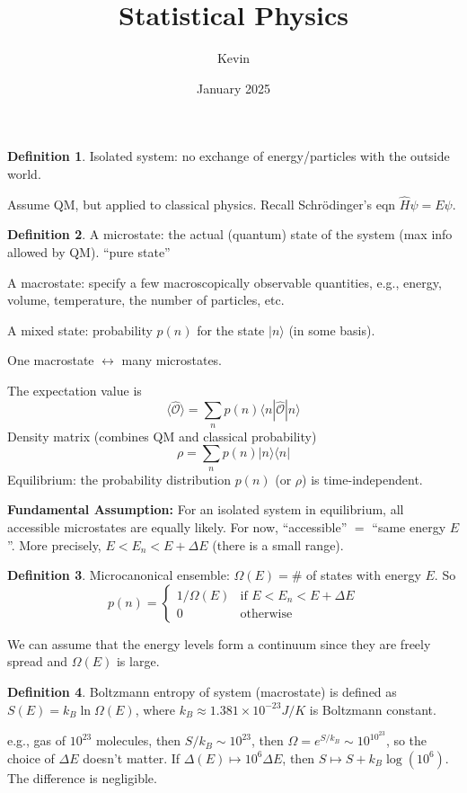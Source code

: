\documentclass{article}
\title{Statistical Physics}
\author{Kevin}
\date{January 2025}
\theoremstyle{definition}
\newtheorem{defn}{Definition}[section]
\theoremstyle{remark}
\theoremstyle{plain}
\begin{document}
\maketitle
\section{}
\begin{defn}
    Isolated system: no exchange of energy/particles with the outside world.
\end{defn}
Assume QM, but applied to classical physics.
Recall Schr\"odinger's eqn $\hat H\psi=E\psi$.
\begin{defn}
    A microstate: the actual (quantum) state of the system (max info allowed by QM). ``pure state''

    A macrostate: specify a few macroscopically observable quantities, e.g., energy, volume, temperature, the number of particles, etc.

    A mixed state: probability $p(n)$ for the state $|n\rangle$ (in some basis).
\end{defn}
One macrostate $\leftrightarrow$ many microstates. 

The expectation value is 
\[\langle\hat{\mathcal{O}}\rangle=\sum_np(n)\langle n|\hat{\mathcal O}|n\rangle\]
Density matrix (combines QM and classical probability)
\[\rho=\sum_n p(n)|n\rangle\langle n|\]
Equilibrium: the probability distribution $p(n)$ (or $\rho$) is time-independent.

\textbf{Fundamental Assumption:} For an isolated system in equilibrium, all accessible microstates are equally likely. For now, ``accessible'' $=$ ``same energy $E$''. More precisely, $E<E_n<E+\Delta E$ (there is a small range).
\begin{defn}
    Microcanonical ensemble: $\Omega(E)=\#$ of states with energy $E$. So
    \[p(n)=\begin{cases}
        1/\Omega(E) & \text{if }E<E_n<E+\Delta E\\
        0 & \text{otherwise}
     \end{cases}\]
\end{defn}
We can assume that the energy levels form a continuum since they are freely spread and $\Omega(E)$ is large.

\begin{defn}
    Boltzmann entropy of system (macrostate) is defined as 
    $S(E)=k_B\ln\Omega(E)$, where $k_B\approx 1.381\times 10^{-23}J/K$ is Boltzmann constant.
\end{defn}
e.g., gas of $10^{23}$ molecules, then $S/k_B\sim 10^{23}$, then $\Omega=e^{S/k_B}\sim 10^{10^{23}}$, so the choice of $\Delta E$ doesn't matter. If $\Delta(E)\mapsto 10^6\Delta E$, then $S\mapsto S+k_B\log(10^6)$. The difference is negligible.
\end{document}
